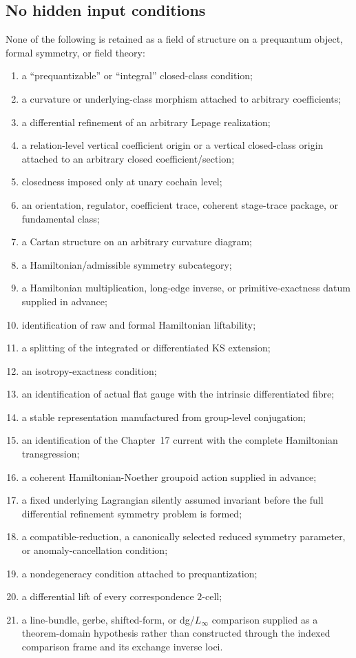 \subsection{No hidden input conditions}
\label{subsec:prequantum-audit-no-hidden-input}

None of the following is retained as a field of structure on a prequantum object,
formal symmetry, or field theory:
\begin{enumerate}
\item a ``prequantizable'' or ``integral'' closed-class condition;
\item a curvature or underlying-class morphism attached to arbitrary coefficients;
\item a differential refinement of an arbitrary Lepage realization;
\item a relation-level vertical coefficient origin or a vertical closed-class
      origin attached to an arbitrary closed coefficient/section;
\item closedness imposed only at unary cochain level;
\item an orientation, regulator, coefficient trace, coherent stage-trace package,
      or fundamental class;
\item a Cartan structure on an arbitrary curvature diagram;
\item a Hamiltonian/admissible symmetry subcategory;
\item a Hamiltonian multiplication, long-edge inverse, or primitive-exactness
      datum supplied in advance;
\item identification of raw and formal Hamiltonian liftability;
\item a splitting of the integrated or differentiated KS extension;
\item an isotropy-exactness condition;
\item an identification of actual flat gauge with the intrinsic differentiated
      fibre;
\item a stable representation manufactured from group-level conjugation;
\item an identification of the Chapter~17 current with the complete Hamiltonian
      transgression;
\item a coherent Hamiltonian-Noether groupoid action supplied in advance;
\item a fixed underlying Lagrangian silently assumed invariant before the full
      differential refinement symmetry problem is formed;
\item a compatible-reduction, a canonically selected reduced symmetry parameter,
      or anomaly-cancellation condition;
\item a nondegeneracy condition attached to prequantization;
\item a differential lift of every correspondence $2$-cell;
\item a line-bundle, gerbe, shifted-form, or dg/$L_\infty$ comparison supplied as
      a theorem-domain hypothesis rather than constructed through the indexed
      comparison frame and its exchange inverse loci.
\end{enumerate}

